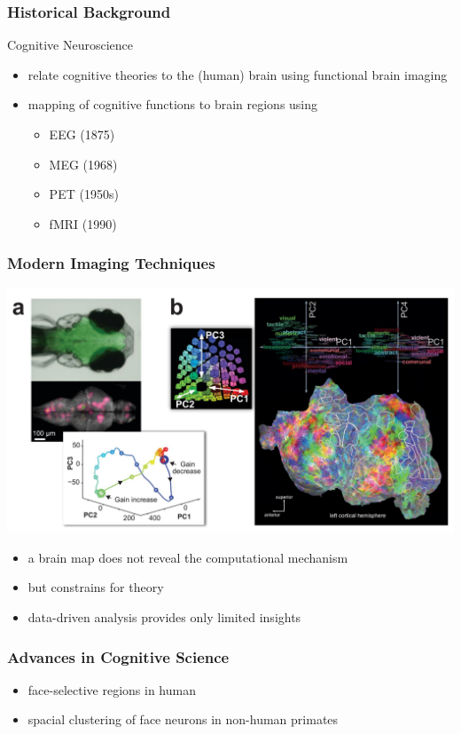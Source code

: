 \documentclass[
t, %
10pt, %
aspectratio=1610, %
ngerman,
english,
]{beamer}
\begin{document}
\begin{frame}
    \frametitle{Historical Background}
    Cognitive Neuroscience
    \begin{itemize}
     \item relate cognitive theories to the (human) brain using functional brain imaging
     \item mapping of cognitive functions to brain regions using
     \begin{itemize}
        \item EEG (1875)
        \item MEG (1968)
        \item PET (1950s)
        \item fMRI (1990)
     \end{itemize}
    \end{itemize}

\end{frame}

\begin{frame}
    \frametitle{Modern Imaging Techniques}
    \centering
    \includegraphics[height=0.7\textheight]{figures/figure1}
    \begin{itemize}
     \item a brain map does not reveal the computational mechanism
     \item but constrains for theory
     \item data-driven analysis provides only limited insights
    \end{itemize}

\end{frame}

\begin{frame}
    \frametitle{Advances in Cognitive Science}
    \begin{itemize}
     \item face-selective regions in human
     \item spacial clustering of face neurons in non-human primates
    \end{itemize}
\end{frame}
\end{document}
